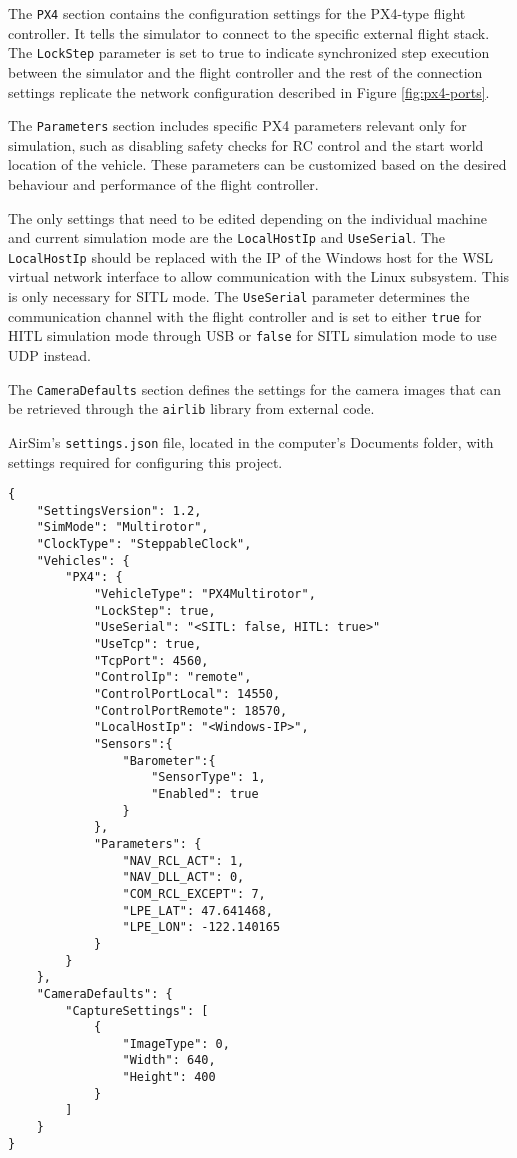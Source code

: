 The \texttt{PX4} section contains the configuration settings for the PX4-type flight controller. It tells the simulator to connect to the specific external flight stack. The \texttt{LockStep} parameter is set to true to indicate synchronized step execution between the simulator and the flight controller and the rest of the connection settings replicate the network configuration described in Figure \ref{fig:px4-ports}.

The \texttt{Parameters} section includes specific PX4 parameters relevant only for simulation, such as disabling safety checks for RC control and the start world location of the vehicle.
These parameters can be customized based on the desired behaviour and performance of the flight controller.

The only settings that need to be edited depending on the individual machine and current simulation mode are the \texttt{LocalHostIp} and \texttt{UseSerial}.
The \texttt{LocalHostIp} should be replaced with the IP of the Windows host for the WSL virtual network interface to allow communication with the Linux subsystem. This is only necessary for SITL mode.
The \texttt{UseSerial} parameter determines the communication channel with the flight controller and is set to either \texttt{true} for HITL simulation mode through USB or \texttt{false} for SITL simulation mode to use UDP instead.

The \texttt{CameraDefaults} section defines the settings for the camera images that can be retrieved through the \texttt{airlib} library from external code. 

\begin{listing}[h]
    \caption{AirSim's \texttt{settings.json} file, located in the computer's Documents folder, with settings required for configuring this project.}
    \label{lst:airsim-settings}
    \begin{verbatim}
{
    "SettingsVersion": 1.2,
    "SimMode": "Multirotor",
    "ClockType": "SteppableClock",
    "Vehicles": {
        "PX4": {
            "VehicleType": "PX4Multirotor",
            "LockStep": true,
            "UseSerial": "<SITL: false, HITL: true>"
            "UseTcp": true,
            "TcpPort": 4560,
            "ControlIp": "remote",
            "ControlPortLocal": 14550,
            "ControlPortRemote": 18570,
            "LocalHostIp": "<Windows-IP>",
            "Sensors":{
                "Barometer":{
                    "SensorType": 1,
                    "Enabled": true
                }
            },
            "Parameters": {
                "NAV_RCL_ACT": 1,
                "NAV_DLL_ACT": 0,
                "COM_RCL_EXCEPT": 7,
                "LPE_LAT": 47.641468,
                "LPE_LON": -122.140165
            }
        }
    },
    "CameraDefaults": {
        "CaptureSettings": [
            {
                "ImageType": 0,
                "Width": 640,
                "Height": 400
            }
        ]
    }
}
    \end{verbatim}
\end{listing}

